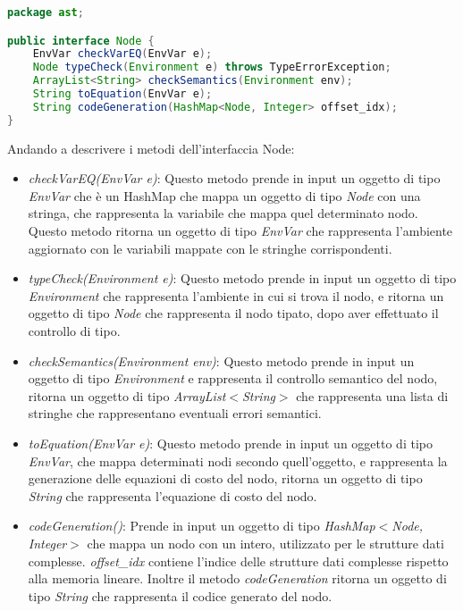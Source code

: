 \documentclass[../../main.tex]{subfiles}
\begin{document}
\begin{lstlisting}[language=Java, caption={Interfaccia Node}]
package ast;

public interface Node {
    EnvVar checkVarEQ(EnvVar e);
    Node typeCheck(Environment e) throws TypeErrorException;
    ArrayList<String> checkSemantics(Environment env);
    String toEquation(EnvVar e);
    String codeGeneration(HashMap<Node, Integer> offset_idx);
}

\end{lstlisting}
Andando a descrivere i metodi dell'interfaccia Node:
\begin{itemize}
    \item \textit{checkVarEQ(EnvVar e)}: Questo metodo prende in input un oggetto di tipo \textit{EnvVar} che è un HashMap che mappa un oggetto di tipo \textit{Node} con una stringa, che rappresenta la variabile che mappa quel determinato nodo. Questo metodo ritorna un oggetto di tipo \textit{EnvVar} che rappresenta l'ambiente aggiornato con le variabili mappate con le stringhe corrispondenti.
    \item \textit{typeCheck(Environment e)}: Questo metodo prende in input un oggetto di tipo \textit{Environment} che rappresenta l'ambiente in cui si trova il nodo, e ritorna un oggetto di tipo \textit{Node} che rappresenta il nodo tipato, dopo aver effettuato il controllo di tipo.
    \item  \textit{checkSemantics(Environment env)}: Questo metodo prende in input un oggetto di tipo \textit{Environment} e rappresenta il controllo semantico del nodo, ritorna un oggetto di tipo \textit{ArrayList$<$String$>$} che rappresenta una lista di stringhe che rappresentano eventuali errori semantici.
    \item \textit{toEquation(EnvVar e)}: Questo metodo prende in input un oggetto di tipo \textit{EnvVar}, che mappa determinati nodi secondo quell'oggetto, e rappresenta la generazione delle equazioni di costo del nodo, ritorna un oggetto di tipo \textit{String} che rappresenta l'equazione di costo del nodo.
    \item \textit{codeGeneration()}: Prende in input un oggetto di tipo \textit{HashMap$<$Node, Integer$>$} che mappa un nodo con un intero, utilizzato per le strutture dati complesse. \textit{offset\_idx} contiene l'indice delle strutture dati complesse rispetto alla memoria lineare. Inoltre il metodo \textit{codeGeneration} ritorna un oggetto di tipo \textit{String} che rappresenta il codice generato del nodo.
\end{itemize}
\end{document}
